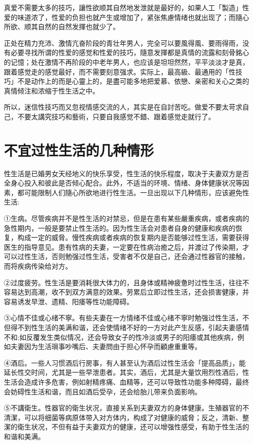 \documentclass[12pt,UTF8]{ctexbook}
\begin{document}
真爱不需要太多的技巧，讓性欲顺其自然地发泄就是最好的，如果人工「製造」性爱的味道浓了，性爱的负担也就产生或增加了，紧张焦慮情绪也就出现了；而隨心所欲、顺其自然的自然发揮也就少了。

正处在精力充沛、激情亢奋阶段的青壮年男人，完全可以要風得風、要雨得雨，没有必要寻找所谓的性爱的感觉和性爱的技巧，隨意发揮都是真情的流露和刻骨銘心的记憶；处在激情不再阶段的中老年男人，也应该是坦坦然然，平平淡淡才是真，跟着感觉走的感觉最好，而不需要刻意强求。实际上，最高級、最通用的「性技巧」不是动作上的而是心靈上的，是盡可能多地把爱慕、依戀、亲密和关心之类的真情倾注和浓缩于性生活之中。

所以，迷信性技巧而又忽视情感交流的人，其实是在自討苦吃。做爱不要太苛求自己，不要太講究技巧和藝術，只要自我感觉不錯、跟着感觉走就行了。

\section{不宜过性生活的几种情形}

性生活是已婚男女天经地义的快乐享受，性生活的快乐程度，取决于夫妻双方是否全身心投入和彼此是否倾心配合。此外，不适当的环境、情绪、身体健康状况等因素，都可能限制人们隨心所欲地进行性生活。一旦出现以下几种情形，应该避免性生活:

①生病。尽管疾病并不是性生活的对禁忌，但是在患有某些嚴重疾病，或者疾病的急性期内，一般是要禁止性生活的。因为性生活会对患者自身的健康和疾病的恢复，构成一定的威脅。慢性疾病或者疾病的恢复期内是否能够过性生活，需要获得医生的指导意见。患有性病的夫妻，一定要在性病治癒之后，并渡过了传染期，才可以过性生活，否则勉强过性生活，受害者不仅是自己，还会通过性器官的接触，而将疾病传染给对方。

②过度疲劳。性生活是要消耗很大体力的，且身体或精神疲惫时过性生活，往往不容易达到高潮，收不到双方满意的效果。劳累后立即过性生活，还会损害健康，并容易诱发早泄、遗精、阳痿等性功能障碍。

③心情不佳或心绪不寧。有些夫妻在一方情绪不佳或心绪不寧时勉强过性生活，不但得不到性生活的美满和谐，还会使情绪不好的一方对此产生反感，引起夫妻感情不和;如反覆发生类似情况，还会导致女子的性冷淡或男子的阳痿或其他疾病，例如夫妻因为生活瑣事吵嘴后、夫妻問由于担心怀孕而顧慮重重等。

④酒后。一些人习惯酒后行房事，有人甚至认为酒后过性生活会「提高品质」，能延长性交时间，尤其是一些早泄患者。其实，酒后，尤其是大量饮用烈性酒后，性生活会造成许多危害，例如射精疼痛、血精等，还可以导致性功能多种障碍，最终会妨碍性生活和谐，而且如酒后受孕，还会给胎儿带来负面影响。

⑤不講衛生。性器官的衛生状况，直接关系到夫妻双方的身体健康。生殖器官的不清潔，可以将细菌等病原体带入对方体内，构成了对健康的威脅；反之，清新、整潔的衛生状况，不但有益于夫妻双方的健康，还可以增强性感受，有助于性生活的和谐和美满。
\end{document}
